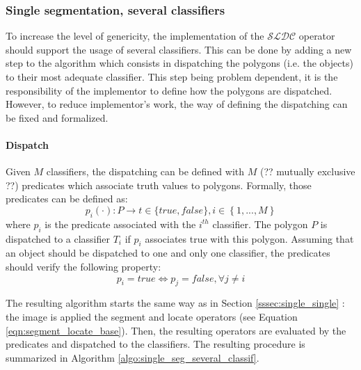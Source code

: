 \subsubsection{Single segmentation, several classifiers}
\label{sssec:single_several}

To increase the level of genericity, the implementation of the $\mathcal{SLDC}$ operator should support the usage of several classifiers. This can be done by adding a new step to the algorithm which consists in dispatching the polygons (i.e. the objects) to their most adequate classifier. This step being problem dependent, it is the responsibility of the implementor to define how the polygons are dispatched. However, to reduce implementor's work, the way of defining the dispatching can be fixed and formalized.

\paragraph{Dispatch} Given $M$ classifiers, the dispatching can be defined with $M$ (?? mutually exclusive ??) predicates which associate truth values to polygons. Formally, those predicates can be defined as: 
\begin{equation}
	p_i(\cdot) : P \rightarrow t \in \{true, false\}, i \in \left\{1,...,M\right\} 
\end{equation}
where $p_i$ is the predicate associated with the $i^{th}$ classifier. The polygon $P$ is dispatched to a classifier $T_i$ if $p_i$ associates true with this polygon. Assuming that an object should be dispatched to one and only one classifier, the predicates should verify the following property: 
\begin{equation}
	p_i = true \Leftrightarrow p_j = false, \forall j \neq i
\end{equation}

The resulting algorithm starts the same way as in Section \ref{sssec:single_single} : the image is applied the segment and locate operators (see Equation \ref{eqn:segment_locate_base}). Then, the resulting operators are evaluated by the predicates and dispatched to the classifiers. The resulting procedure is summarized in Algorithm \ref{algo:single_seg_several_classif}.

